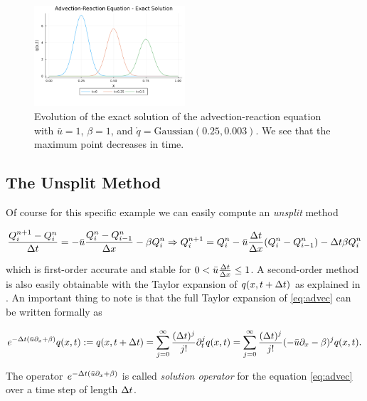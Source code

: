 \documentclass[journal,onecolumn]{IEEEtran}
\begin{document}
\begin{figure}[!ht]
	\centering
	\includegraphics[width=0.5\textwidth]{Advection.png}
	\caption{Evolution of the exact solution of the advection-reaction equation with $\bar{u}=1$, $\beta=1$, and $\mathring{q}=\text{Gaussian}(0.25,0.003)$. We see that the maximum point decreases in time.}
	\label{fig:exact}
\end{figure}

\subsection{The Unsplit Method}

Of course for this specific example we can easily compute an \textit{unsplit} method

\begin{equation}\label{eq:unsplit}
	\frac{Q^{n+1}_i-Q^n_i}{\Delta t} = -\bar{u} \frac{Q^n_i-Q^n_{i-1}}{\Delta x}-\beta Q^n_i \Rightarrow Q^{n+1}_i = Q^n_i-\bar{u} \frac{\Delta t}{\Delta x}(Q^n_i-Q^n_{i-1})-\Delta t\beta Q^n_i
\end{equation}

which is first-order accurate and stable for $0<\bar{u}\frac{\Delta t}{\Delta x}\leq1$.
A second-order method is also easily obtainable with the Taylor expansion of $q(x,t+\Delta t)$ as explained in \cite{leveque}. An important thing to note is that the full Taylor expansion of \eqref{eq:advec} can be written formally as

\begin{equation}\label{eq:sol_op}
	e^{-\Delta t(\bar{u}\partial_x+\beta)}q(x,t):=q(x,t+\Delta t)=\sum_{j=0}^{\infty}\frac{(\Delta t)^j}{j!}\partial_t^jq(x,t)=\sum_{j=0}^{\infty}\frac{(\Delta t)^j}{j!}(-\bar{u}\partial_x-\beta)^jq(x,t).
\end{equation}

The operator $e^{-\Delta t(\bar{u}\partial_x+\beta)}$ is called \textit{solution operator} for the equation \eqref{eq:advec} over a time step of length $\Delta t$.
\end{document}

